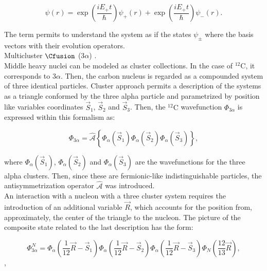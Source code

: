 \documentclass[openany]{book}
\begin{document}
\begin{equation}\label{eq:micro_twoCenterShell_solution_superposition}
	\psi(r) =  \exp {\left(\frac{iE_+ t}{\hbar}\right)} \psi_{+}(r) +   \exp {\left(\frac{iE_+ t}{\hbar}\right)}  \psi_{-}(r).
\end{equation}

The term permits to understand the system as if the states $ \psi_{\pm}$ where the basis vectors with their evolution operators. \\


Multicluster $\Cfusion$ (3$\alpha$) \cite{dufour_descouvemont_1997}. \\

Middle heavy nuclei can be modeled as cluster collections. In the case of $\mathrm{{}^{12}C}$, it corresponds to $3 \alpha$. Then, the carbon nucleus is regarded as a compounded system of three identical particles. Cluster approach permits a description of the systems as a triangle conformed by the three alpha particle and parametrized by position like variables coordinates $\vec S_1 $, $\vec S_2$ and $\vec S_3$. Then, the $\mathrm{{}^{12}C}$ wavefunction $\Phi_{3\alpha}$ is expressed within this formalism as: 

\begin{equation}\label{eq:micro_multicluster_3alpha}
	\Phi_{3\alpha} = \hat {\mathcal{A}} \left\{ \Phi_\alpha (\vec S_1) \Phi_\alpha(\vec S_2) \Phi_\alpha(\vec S_3) \right\},
\end{equation}

where $\Phi_\alpha (\vec S_1)$,   $\Phi_\alpha (\vec S_2)$ and 
$\Phi_\alpha (\vec S_3)$ are the wavefunctions for the three alpha clusters. Then, since these are fermionic-like indistinguishable particles, the antisymmetrization operator  $\hat {\mathcal{A}} $ was introduced. \\

An interaction with a nucleon with a three cluster system requires the introduction of an additional variable $\vec R$, which accounts for the position from, approximately, the center of the triangle to the nucleon. The picture of the composite state related to the last description has the form: 


\begin{equation} 	\label{eq:micro_multicluster_abc}
	\Phi^{N}_{3\alpha} = \Phi_\alpha \left (\frac{1}{12} \vec R - \vec S_1 \right )  \Phi_\alpha \left (\frac{1}{12} \vec R - \vec S_2 \right )  \Phi_\alpha \left (\frac{1}{12} \vec R - \vec S_3 \right )  \Phi_N \left( \frac{12}{13} \vec R \right),
\end{equation},
\end{document}
